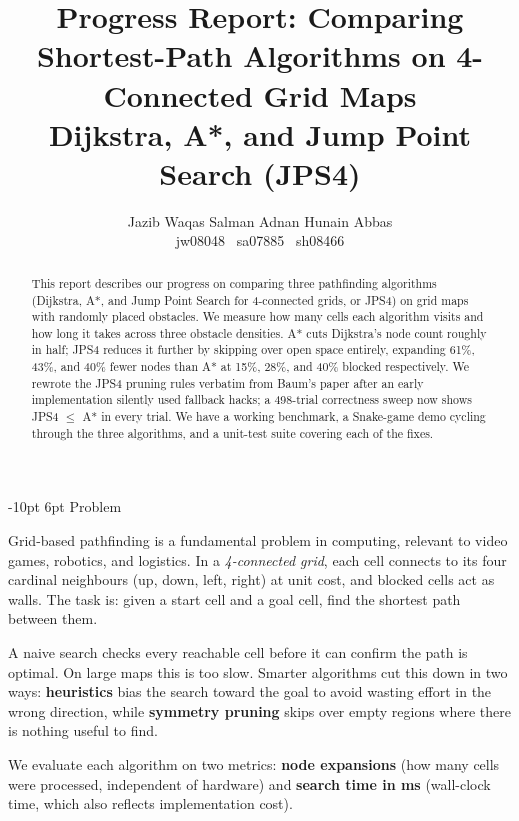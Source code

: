 \documentclass[11pt,twocolumn,a4paper]{article}
\title{\vspace{-1.6em}%
\textbf{Progress Report: Comparing Shortest-Path Algorithms on 4-Connected Grid Maps}\\[-2pt]
{\normalsize Dijkstra, A*, and Jump Point Search (JPS4)}\vspace{-0.4em}}
\author{%
  Jazib Waqas \enspace Salman Adnan \enspace Hunain Abbas \\[-1pt]
  {\small jw08048 \textperiodcentered\ sa07885 \textperiodcentered\ sh08466}%
  \vspace{-0.8em}}
\date{}
\makeatletter
\renewcommand\section{\@startsection{section}{1}{\z@}%
  {-10pt \@plus -2pt \@minus -2pt}%
  {6pt \@plus 2pt}%
  {\normalfont\large\bfseries}}
\makeatother
\begin{document}
\maketitle

\begin{abstract}
\vspace{-4pt}
This report describes our progress on comparing three pathfinding algorithms
(Dijkstra, A*, and Jump Point Search for 4-connected grids, or JPS4) on grid
maps with randomly placed obstacles. We measure how many cells each algorithm
visits and how long it takes across three obstacle densities. A* cuts
Dijkstra's node count roughly in half; JPS4 reduces it further by skipping
over open space entirely, expanding 61\%, 43\%, and 40\% fewer nodes than A*
at 15\%, 28\%, and 40\% blocked respectively. We rewrote the JPS4 pruning
rules verbatim from Baum's paper after an early implementation silently used
fallback hacks; a 498-trial correctness sweep now shows JPS4 $\leq$ A* in
every trial. We have a working benchmark, a Snake-game demo cycling through
the three algorithms, and a unit-test suite covering each of the fixes.
\end{abstract}

\section{Problem}

Grid-based pathfinding is a fundamental problem in computing, relevant to video
games, robotics, and logistics. In a \emph{4-connected grid}, each cell connects
to its four cardinal neighbours (up, down, left, right) at unit cost, and blocked
cells act as walls. The task is: given a start cell and a goal cell, find the
shortest path between them.

A naive search checks every reachable cell before it can confirm the path is
optimal. On large maps this is too slow. Smarter algorithms cut this down in
two ways: \textbf{heuristics} bias the search toward the goal to avoid wasting
effort in the wrong direction, while \textbf{symmetry pruning} skips over empty
regions where there is nothing useful to find.

We evaluate each algorithm on two metrics: \textbf{node expansions} (how many
cells were processed, independent of hardware) and \textbf{search time in ms}
(wall-clock time, which also reflects implementation cost).

\end{document}
